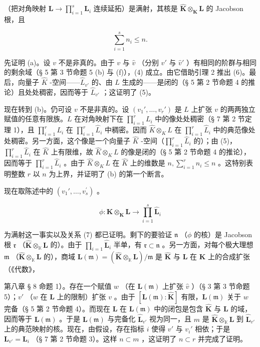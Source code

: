 （把对角映射 \(\mathbf{L} \to \prod_{i=1}^{s} \mathbf{L}_i\) 连续延拓）是满射，其核是 \(\hat{\mathbf{K}} \otimes_{\mathbf{K}} \mathbf{L}\) 的 Jacobson 根，且

\[
\sum_ {i = 1} ^ {s} n _ {i} \leqslant n.\tag{7}
\]

先证明 (a)。设 \(v\) 不是非真的。由于 \(v\) 与 \(\hat{v}\) （分别 \(v'\) 与 \(\hat{v}'\) ）有相同的阶群与相同的剩余域（§ 5 第 3 节命题 5 (b) 与 (f)），(4) 成立。由它借助引理 2 推出 (6)。最后，向量子 \(\hat{K}\) -空间——\(\hat{L}_{v'}\) 的、由 \(L\) 生成的——是闭的（§ 5 第 2 节命题 4 的推论）且处处稠密，因而等于 \(\hat{L}_{v'}\) ；这证明了 (5)。

现在转到 (b)。仍可设 \(v\) 不是非真的。设 \((v_1', \ldots, v_r')\) 是 \(L\) 上扩张 \(v\) 的两两独立赋值的任意有限族。\(L\) 在对角映射下在 \(\prod_{i=1}^{r} L_i\) 中的像处处稠密（§ 7 第 2 节定理 1），且 \(\prod_{i=1}^{r} L_i\) 在 \(\prod_{i=1}^{r} \hat{L}_i\) 中稠密。因而 \(\hat{K} \otimes_K L\) 在 \(\prod_{i=1}^{r} \hat{L}_i\) 中的典范像处处稠密。另一方面，这个像是一个向量子 \(\hat{K}\) -空间（\(\prod_{i=1}^{r} \hat{L}_i\) 的）；由 (5)，\(\prod_{i=1}^{r} \hat{L}_i\) 在 \(\hat{K}\) 上有限维，故 \(\hat{K} \otimes_K L\) 的像是闭的（§ 5 第 2 节命题 4 的推论），因而等于 \(\prod_{i=1}^{r} \hat{L}_i\) 。由于 \(\hat{K} \otimes_K L\) 在 \(\hat{K}\) 上的维数是 \(n, \sum_{i=1}^{r} n_i \leqslant n\) 。这特别表明整数 \(r\) 以 \(n\) 为上界，并证明了 (b) 的第一个断言。

现在取陈述中的 \((v_{1}',\ldots ,v_{s}^{\prime})\) 。

\[
\phi : \hat {\mathbf {K}} \otimes_ {\mathbf {K}} \mathbf {L} \rightarrow \prod_ {i = 1} ^ {s} \hat {\mathbf {L}} _ {i}
\]

为满射这一事实以及关系 (7) 都已证明。剩下的要验证 \(\mathfrak{n}\) （\(\phi\) 的核）是 Jacobson 根 \(\mathfrak{r}\) （\(\hat{\mathbf{K}}\otimes_{\mathbb{K}}\mathbf{L}\) 的）。由于 \(\prod_{i = 1}\hat{\mathbf{L}}_i\) 半单，有 \(\mathfrak{r}\subset \mathfrak{n}\) 。另一方面，对每个极大理想 \(\mathfrak{m}\) （\(\hat{\mathbf{K}}\otimes_{\mathbb{K}}\mathbf{L}\) 的），商域 \(\mathbf{L}(\mathfrak{m}) = (\hat{\mathbf{K}}\otimes_{\mathbb{K}}\mathbf{L}) / \mathfrak{m}\) 是 \(\hat{\mathbf{K}}\) 与 \(\mathbf{L}\) 在 \(\mathbf{K}\) 上的合成扩张（《代数》，

第八章 § 8 命题 1）。存在一个赋值 \(w\) （在 \(\mathbf{L}(\mathfrak{m})\) 上扩张 \(\hat{v}\) ）（§ 3 第 3 节命题 5）；\(v'\) （\(w\) 在 \(\mathbf{L}\) 上的限制）扩张 \(v\) 。由于 \([\mathbf{L}(\mathfrak{m}): \hat{\mathbf{K}}]\) 有限，\(\mathbf{L}(\mathfrak{m})\) 关于 \(w\) 完备（§ 5 第 2 节命题 4）。而现在 \(\mathbf{L}\) 在 \(\mathbf{L}(\mathfrak{m})\) 中的闭包是包含 \(\hat{\mathbf{K}}\) 与 \(\mathbf{L}\) 的域，因而等于 \(\mathbf{L}(\mathfrak{m})\) 。于是 \(\mathbf{L}(\mathfrak{m})\) 与完备化 \(\hat{\mathbf{L}}_{v'}\) 视为同一，且 \(m\) 是 \(\hat{\mathbf{K}} \otimes_{\mathbb{K}} \mathbf{L}\) 到 \(\hat{\mathbf{L}}_{v'}\) 上的典范映射的核。现在，由假设，存在指标 \(i\) 使得 \(v'\) 与 \(v_i'\) 相依；于是 \(\mathbf{L}_{v'} = \mathbf{L}_i\) （§ 7 第 2 节命题 3）。这样 \(n \subset m\) ，这证明了 \(n \subset r\) 并完成了证明。

